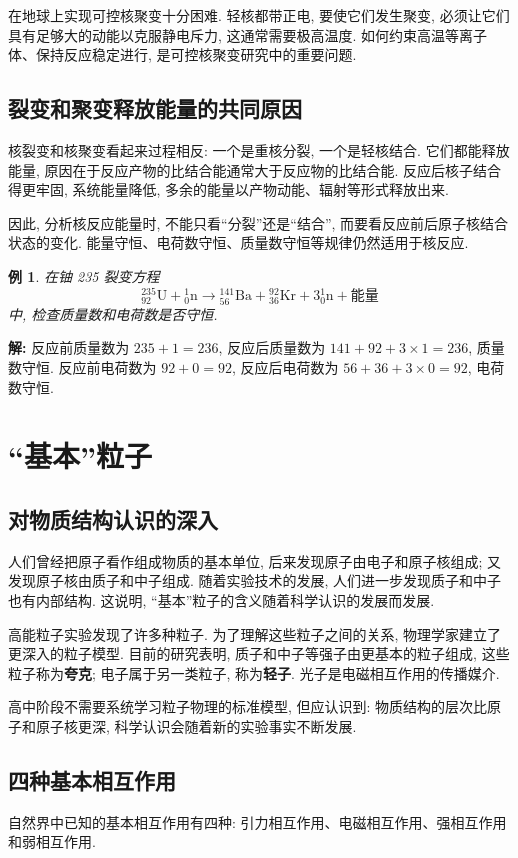 \documentclass[UTF8,openany,fontset=fandol]{ctexbook}
\theoremstyle{chinesetextbook}
\newtheorem{example}{例}[chapter]
\newenvironment{solution}{\par\indent\textbf{解:} \ignorespaces}{\par}
\begin{document}
在地球上实现可控核聚变十分困难. 轻核都带正电, 要使它们发生聚变, 必须让它们具有足够大的动能以克服静电斥力, 这通常需要极高温度. 如何约束高温等离子体、保持反应稳定进行, 是可控核聚变研究中的重要问题.
\subsection{裂变和聚变释放能量的共同原因}
核裂变和核聚变看起来过程相反: 一个是重核分裂, 一个是轻核结合. 它们都能释放能量, 原因在于反应产物的比结合能通常大于反应物的比结合能. 反应后核子结合得更牢固, 系统能量降低, 多余的能量以产物动能、辐射等形式释放出来.

因此, 分析核反应能量时, 不能只看“分裂”还是“结合”, 而要看反应前后原子核结合状态的变化. 能量守恒、电荷数守恒、质量数守恒等规律仍然适用于核反应.
\begin{example}
在铀 235 裂变方程
\[
{}^{235}_{92}\mathrm{U}+{}^{1}_{0}\mathrm{n}\rightarrow{}^{141}_{56}\mathrm{Ba}+{}^{92}_{36}\mathrm{Kr}+3{}^{1}_{0}\mathrm{n}+\text{能量}
\]
中, 检查质量数和电荷数是否守恒.
\end{example}
\begin{solution}
反应前质量数为 $235+1=236$, 反应后质量数为 $141+92+3\times1=236$, 质量数守恒. 反应前电荷数为 $92+0=92$, 反应后电荷数为 $56+36+3\times0=92$, 电荷数守恒.
\end{solution}
\section{“基本”粒子}
\subsection{对物质结构认识的深入}
人们曾经把原子看作组成物质的基本单位, 后来发现原子由电子和原子核组成; 又发现原子核由质子和中子组成. 随着实验技术的发展, 人们进一步发现质子和中子也有内部结构. 这说明, “基本”粒子的含义随着科学认识的发展而发展.

高能粒子实验发现了许多种粒子. 为了理解这些粒子之间的关系, 物理学家建立了更深入的粒子模型. 目前的研究表明, 质子和中子等强子由更基本的粒子组成, 这些粒子称为\textbf{夸克}; 电子属于另一类粒子, 称为\textbf{轻子}. 光子是电磁相互作用的传播媒介.

高中阶段不需要系统学习粒子物理的标准模型, 但应认识到: 物质结构的层次比原子和原子核更深, 科学认识会随着新的实验事实不断发展.
\subsection{四种基本相互作用}
自然界中已知的基本相互作用有四种: 引力相互作用、电磁相互作用、强相互作用和弱相互作用.
\end{document}
